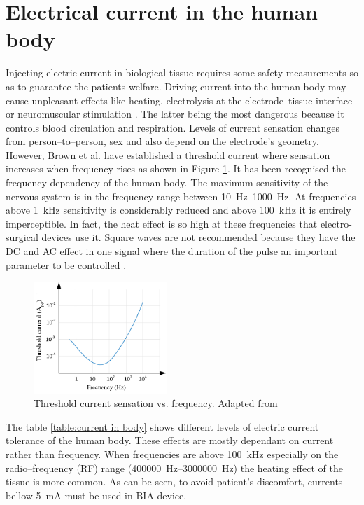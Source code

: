 \section{Electrical current in the human body} %
\label{section impedance current in body}
Injecting electric current in biological tissue requires some safety measurements so as to guarantee the patients welfare. Driving current into the human body may cause unpleasant effects like heating, electrolysis at the electrode–tissue interface or neuromuscular stimulation \cite{bertemes2002tissue, martinsen2011bioimpedance}. The latter being the most dangerous because it controls blood circulation and respiration. Levels of current sensation changes from person–to–person, sex and also depend on the electrode’s geometry. However, Brown et al. \cite{brown1998medical} have established a threshold current where sensation increases when frequency rises as shown in Figure \ref{fig:threshold sensation}. It has been recognised the frequency dependency of the human body. The maximum sensitivity of the nervous system is in the frequency range between \SIrange[scientific-notation = engineering]{10}{1000}{\hertz}. At frequencies above \SI{1}{\kilo\hertz} sensitivity is considerably reduced and above \SI{100}{\kilo\hertz} it is entirely imperceptible. In fact, the heat effect is so high at these frequencies that electro-surgical devices use it. Square waves are not recommended because they have the DC and AC effect in one signal where the duration of the pulse an important parameter to be controlled \cite{martinsen2011bioimpedance}.

\begin{figure}[!htpb]
	\centering
	\includegraphics[width=0.45\textwidth,keepaspectratio]{figure14}    
	\caption[Threshold current sensation vs. frequency]{Threshold current sensation vs. frequency. Adapted from \cite{brown1998medical}}
	\label{fig:threshold sensation}
\end{figure}

The table \ref{table:current in body} shows different levels of electric current tolerance of the human body. These effects are mostly dependant on current rather than frequency. When frequencies are above \SI{100}{\kilo\hertz} especially on the radio–frequency (RF) range (\SIrange[scientific-notation = engineering]{400000}{3000000}{\hertz}) the heating effect of the tissue is more common. As can be seen, to avoid patient’s discomfort, currents bellow \SI{5}{\milli\ampere} must be used in BIA device.

